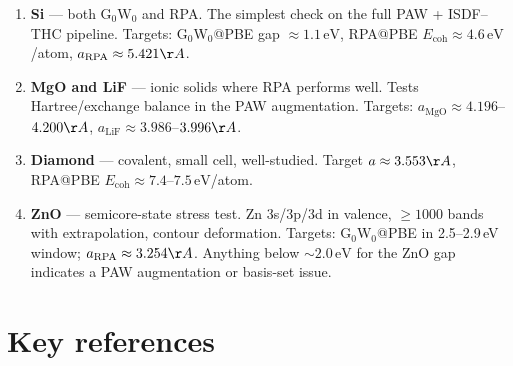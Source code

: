 \documentclass[11pt]{article}
\newcommand{\eV}{\ensuremath{\,\mathrm{eV}}}
\begin{document}
\begin{enumerate}
  \item \textbf{Si} --- both G$_0$W$_0$ and RPA. The simplest check on
        the full PAW + ISDF--THC pipeline. Targets: G$_0$W$_0$@PBE gap
        $\approx 1.1\eV$, RPA@PBE $E_{\mathrm{coh}} \approx 4.6\eV$/atom,
        $a_{\mathrm{RPA}} \approx 5.421\AA$.
  \item \textbf{MgO and LiF} --- ionic solids where RPA performs well.
        Tests Hartree/exchange balance in the PAW augmentation. Targets:
        $a_{\mathrm{MgO}} \approx 4.196$--$4.200\AA$,
        $a_{\mathrm{LiF}} \approx 3.986$--$3.996\AA$.
  \item \textbf{Diamond} --- covalent, small cell, well-studied. Target
        $a \approx 3.553\AA$, RPA@PBE $E_{\mathrm{coh}} \approx
        7.4$--$7.5\eV$/atom.
  \item \textbf{ZnO} --- semicore-state stress test. Zn 3s/3p/3d in
        valence, $\geq 1000$ bands with extrapolation, contour
        deformation. Targets: G$_0$W$_0$@PBE in 2.5--2.9\,eV window;
        $a_{\mathrm{RPA}} \approx 3.254\AA$. Anything below
        $\sim 2.0\eV$ for the ZnO gap indicates a PAW augmentation or
        basis-set issue.
\end{enumerate}

\section{Key references}
\end{document}
